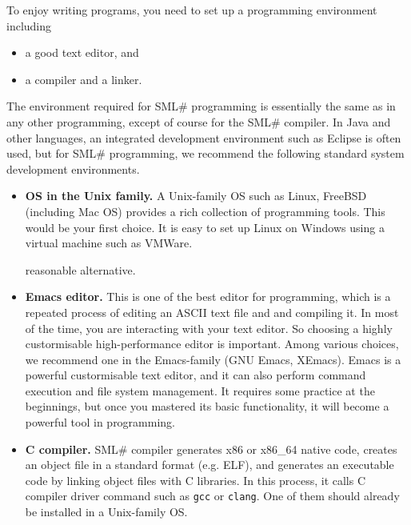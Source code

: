 \documentclass{jbook}
\newcommand{\smlsharp}{SML\#}
\begin{document}
\else%
	To enjoy writing programs, you need to set up a programming
environment including 
\begin{itemize}
\item a good text editor, and
\item a compiler and a linker.
\end{itemize}
	The environment required for \smlsharp{} programming is
essentially the same as in any other programming, except of course for
the \smlsharp{} compiler.
	In Java and other languages, an integrated development
environment such as Eclipse is often used, but for \smlsharp{}
programming, we recommend the following standard system development
environments.

\begin{itemize}
\item {\bf OS in the Unix family.}
	A Unix-family OS such as Linux, FreeBSD (including Mac OS)
provides a rich collection of programming tools.
	This would be your first choice.
	It is easy to set up Linux on Windows using a virtual machine
such as VMWare.

reasonable alternative.
	
\item {\bf Emacs editor.}
	This is one of the best editor for programming, which is a
repeated process of editing an ASCII text file and and compiling it.
	In most of the time, you are interacting with your text editor.
	So choosing a highly custormisable high-performance editor is
important.
	Among various choices, we recommend one in the Emacs-family (GNU
Emacs, XEmacs).
	Emacs is a powerful custormisable text editor, and it can also
perform command execution and file system management.
	It requires some practice at the beginnings, but once you mastered
its basic functionality, it will become a powerful tool in programming.

\item {\bf C compiler.}
	\smlsharp{} compiler generates x86 or x86\_64 native code,
creates an
object file in a standard format (e.g. ELF), and generates an executable
code by linking object files with C libraries.
	In this process, it calls C compiler driver command such as
{\tt gcc} or {\tt clang}.
	One of them should already be installed in a Unix-family OS.


\end{itemize}
\end{document}
